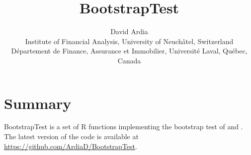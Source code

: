 \documentclass[11pt]{article}
\begin{document}
\title{BootstrapTest}
\author{David Ardia\\
Institute of Financial Analysis, University of Neuch\^atel, Switzerland\\
D\'epartement de Finance, Assurance et Immobilier, Universit\'e Laval, Qu\'ebec, Canada}
	
\maketitle

\section*{Summary}

BootstrapTest is a set of R functions implementing the bootstrap test of
\citet{ArdiaEtAl2016} and \citet{ArdiaEtAl2017}. The latest version of the code is 
available at \url{https://github.com/ArdiaD/BootstrapTest}.



	
\end{document}
